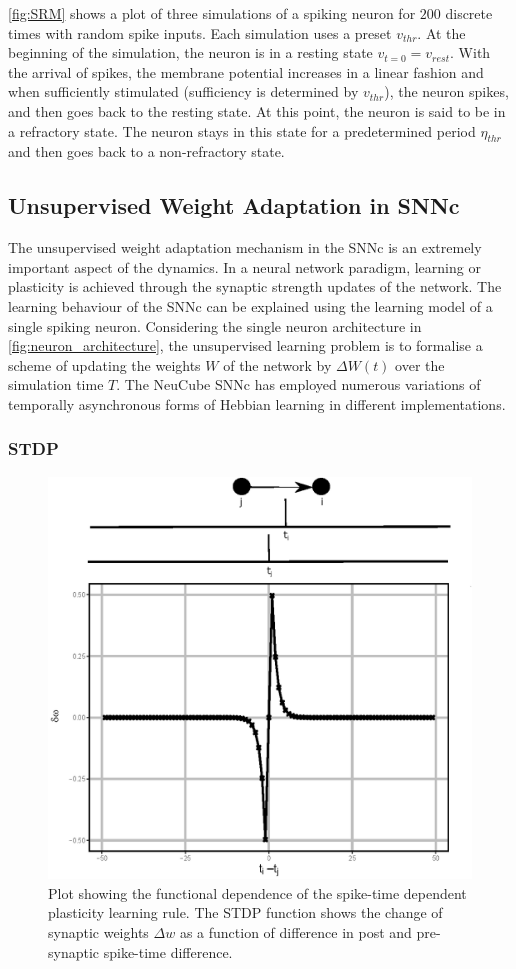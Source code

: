 \figurename \ref{fig:SRM} shows a plot of three simulations of a spiking neuron for $200$ discrete times with random spike inputs. Each simulation uses a preset $v_{thr}$. At the beginning of the simulation, the neuron is in a resting state $v_{t=0}=v_{rest}$. With the arrival of spikes, the membrane potential increases in a linear fashion and when sufficiently stimulated (sufficiency is determined by $v_{thr}$), the neuron spikes, and then goes back to the resting state. At this point, the neuron is said to be in a refractory state. The neuron stays in this state for a predetermined period $\eta_{thr}$ and then goes back to a non-refractory state.  

\subsection{Unsupervised Weight Adaptation in SNNc}

The unsupervised weight adaptation mechanism in the SNNc is an extremely important aspect of the dynamics. In a neural network paradigm, learning or plasticity is achieved through the synaptic strength updates of the network. The learning behaviour of the SNNc can be explained using the learning model of a single spiking neuron. Considering the single neuron architecture in \figurename \ref{fig:neuron_architecture}, the unsupervised learning problem is to formalise a scheme of updating the weights $W$ of the network by $\Delta W(t)$ over the simulation time $T$. The NeuCube SNNc has employed numerous variations of temporally asynchronous forms of Hebbian learning in different implementations. 

\subsubsection{STDP} 
\label{subsec:STDP}
\begin{figure}
	\centering
	\includegraphics[width=0.8\linewidth]{fig/largesnn/STDP.eps}
	\caption{Plot showing the functional dependence of the spike-time dependent plasticity learning rule. The STDP function shows the change of synaptic weights $\Delta w$ as a function of difference in post and pre-synaptic spike-time difference.}
	\label{fig:STDP_exp1}
\end{figure}


